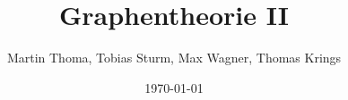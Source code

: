 \documentclass[hyperref={pdfpagelabels=false}]{beamer}
\begin{document}
\title{Graphentheorie II}   
\author{Martin Thoma, Tobias Sturm, Max Wagner, Thomas Krings} 
\date{\today} 
\subject{Graphentheorie-Referat fur ICPC}

\frame{\titlepage} 


\end{document}
